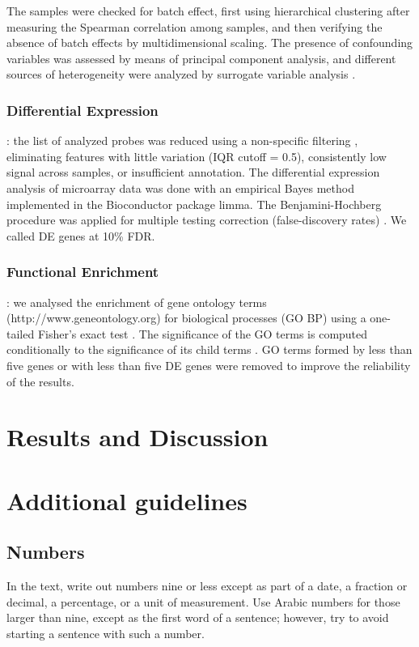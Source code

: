 \documentclass[9pt,twocolumn,twoside]{gsajnl}
\begin{document}
The samples were checked for batch effect, first using hierarchical clustering after measuring the Spearman correlation among samples, and then verifying the absence of batch effects by multidimensional scaling. The presence of confounding variables was assessed by means of principal component analysis, and different sources of heterogeneity were analyzed by surrogate variable analysis \citep{Leek2007}.

\subsubsection*{Differential Expression}: the list of analyzed probes was reduced using a non-specific filtering \citep{Bourgon2010}, eliminating features with little variation (IQR cutoff = 0.5), consistently low signal across samples, or insufficient annotation. The differential expression analysis of microarray data was done with an empirical Bayes method \citep{Smyth2004} implemented in the Bioconductor package limma. The Benjamini-Hochberg procedure was applied for multiple testing correction (false-discovery rates) \citep{Benjamini1995}. We called DE genes at 10\% FDR.

\subsubsection*{Functional Enrichment}: we analysed the enrichment of gene ontology terms (http://www.geneontology.org) for biological processes (GO BP) using a one-tailed Fisher's exact test \citep{Fisher1922}. The significance of the GO terms is computed conditionally to the significance of its child terms \citep{Alexa2006}. GO terms formed by less than five genes or with less than five DE genes were removed to improve the reliability of the results.

\section*{Results and Discussion}


\section*{Additional guidelines}

\subsection*{Numbers} In the text, write out numbers nine or less except as part of a date, a fraction or decimal, a percentage, or a unit of measurement. Use Arabic numbers for those larger than nine, except as the first word of a sentence; however, try to avoid starting a sentence with such a number.
\end{document}
